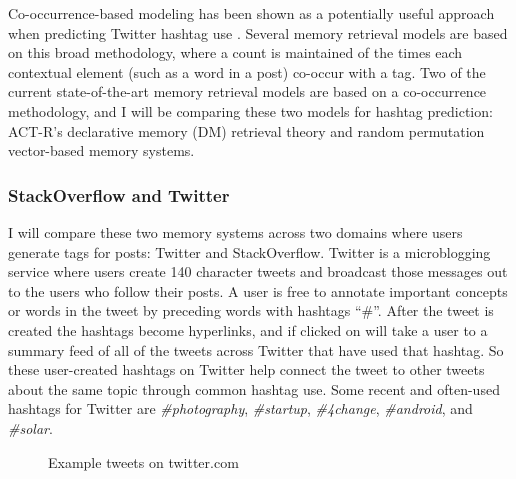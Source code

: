\documentclass[man,floatsintext,donotrepeattitle]{apa6}
\begin{document}
Co-occurrence-based modeling has been shown as a potentially useful approach when predicting Twitter hashtag use \parencite{Efron2010}.
Several memory retrieval models are based on this broad methodology, where a count is maintained of the times each contextual element (such as a word in a post) co-occur with a tag.
Two of the current state-of-the-art memory retrieval models are based on a co-occurrence methodology, and I will be comparing these two models for hashtag prediction:
ACT-R's declarative memory (DM) retrieval theory and random permutation vector-based memory systems.

\subsubsection{StackOverflow and Twitter}

I will compare these two memory systems across two domains where users generate tags for posts: Twitter and StackOverflow.
Twitter is a microblogging service where users create 140 character tweets and broadcast those messages out to the users who follow their posts.
A user is free to annotate important concepts or words in the tweet by preceding words with hashtags ``\#''.
After the tweet is created the hashtags become hyperlinks, and if clicked on will take a user to a summary feed of all of the tweets across Twitter that have used that hashtag.
So these user-created hashtags on Twitter help connect the tweet to other tweets about the same topic through common hashtag use.
Some recent and often-used hashtags for Twitter are \emph{\#photography}, \emph{\#startup}, \emph{\#4change}, \emph{\#android}, and \emph{\#solar}.

\begin{figure}[!htbp]
  {%
    \setlength{\fboxsep}{0pt}%
    \setlength{\fboxrule}{1pt}%
    \hfill
    \hfill
    \hfill
    \vfill
    \hfill
    \hfill
    \hfill
    \caption{Example tweets on twitter.com}
    \label{figTweetExample}
  }%
\end{figure}
\end{document}

